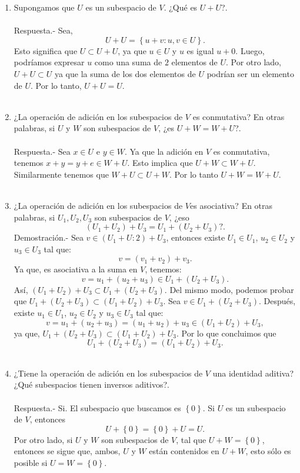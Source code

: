 \begin{enumerate}[\bfseries 1.]
    \item Supongamos que $U$ es un subespacio de $V$. ¿Qué es $U+U$?.\\\\
	Respuesta.-\; Sea,
	$$U+U=\left\{u+v:u,v\in U\right\}.$$
	Esto significa que $U\subset U+U$, ya que $u\in U$ y $u$ es igual $u+0$. Luego, podríamos expresar $u$ como una suma de $2$ elementos de $U$. Por otro lado, $U+U\subset U$ ya que la suma de los dos elementos de $U$ podrían ser un elemento de $U$. Por lo tanto, $U+U=U$.\\\\

    \item ¿La operación de adición en los subespacios de $V$ es conmutativa? En otras palabras, si $U$ y $W$ son subespacios de $V$, ¿es $U + W = W + U$?.\\\\
	Respuesta.-\; Sea $x\in U$ e $y\in W$. Ya que la adición en $V$ es conmutativa, tenemos $x+y=y+e\in W+U$. Esto implica que $U+W\subset W+U$. Similarmente tenemos que $W+U\subset U+W$. Por lo tanto $U+W=W+U.$\\\\

    \item ¿La operación de adición en los subespacios de $V$es asociativa? En otras palabras, si $U_1,U_2,U_3$ son subespacios de $V$, ¿eso
    $$(U_1+U_2)+U_3 = U_1+(U_2+U_3)?.$$
	Demostración.-\; Sea $v\in(U_1+U:2)+U_3$, entonces existe $U_1\in U_1$, $u_2\in U_2$ y $u_3\in U_3$ tal que:
	$$v=(v_1+v_2)+v_3.$$
	Ya que, es asociativa a la suma en $V$, tenemos:
	$$v=u_1+(u_2+u_3)\in U_1+(U_2+U_3).$$
	Así, $(U_1+U_2)+U_3\subset U_1+(U_2+U_3)$. Del mismo modo, podemos probar que $U_1+(U_2+U_3)\subset (U_1+U_2)+U_3$. Sea $v\in U_1+(U_2+U_3)$. Después, existe $u_1\in U_1$, $u_2\in U_2$ y $u_3\in U_3$ tal que:
	$$v=u_1+(u_2+u_3)=(u_1+u_2)+u_3\in (U_1+U_2)+U_3,$$
	ya que, $U_1+(U_2+U_3)\subset (U_1+U_2)+U_3.$
	Por lo que concluimos que 
	$$U_1+(U_2+U_3)=(U_1+U_2)+U_3.$$\\

    \item ¿Tiene la operación de adición en los subespacios de $V$ una identidad aditiva? ¿Qué subespacios tienen inversos aditivos?.\\\\
	Respuesta.-\; Si. El subespacio que buscamos es $\left\{0\right\}$. Si $U$ es un subespacio de $V$, entonces
	$$U+\left\{0\right\}= \left\{0\right\}+U=U.$$
	Por otro lado, si $U$ y $W$ son subespacios de $V$, tal que $U+W=\left\{0\right\}$, entonces se sigue que, ambos, $U$ y $W$ están contenidos en $U+W$, esto sólo es posible si $U=W=\left\{0\right\}$.\\\\


\end{enumerate}
